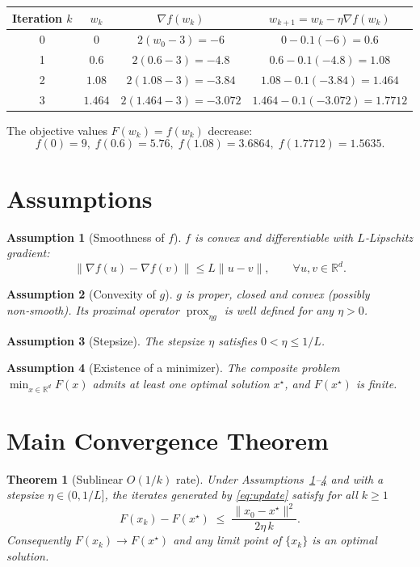 \documentclass{article}
\newtheorem{theorem}{Theorem}
\newtheorem{assumption}{Assumption}
\newcommand{\prox}{\operatorname{prox}}
\newcommand{\R}{\mathbb{R}}
\begin{document}
\begin{center}
\begin{tabular}{c|c|c|c}
Iteration $k$ & $w_{k}$ & $\nabla f(w_{k})$ & $w_{k+1}=w_{k}-\eta\nabla f(w_{k})$ \\ \hline
0 & $0$ & $2(w_{0}-3)=-6$ & $0-0.1(-6)=0.6$ \\
1 & $0.6$ & $2(0.6-3)=-4.8$ & $0.6-0.1(-4.8)=1.08$ \\
2 & $1.08$ & $2(1.08-3)=-3.84$ & $1.08-0.1(-3.84)=1.464$ \\
3 & $1.464$ & $2(1.464-3)=-3.072$ & $1.464-0.1(-3.072)=1.7712$
\end{tabular}
\end{center}
The objective values $F(w_{k})=f(w_{k})$ decrease:
\[
f(0)=9,\; f(0.6)=5.76,\; f(1.08)=3.6864,\; f(1.7712)=1.5635.
\]

\newpage
\section*{Assumptions}
\begin{assumption}[Smoothness of $f$]
\label{ass:smooth}
$f$ is convex and differentiable with $L$‑Lipschitz gradient:
\[
\|\nabla f(u)-\nabla f(v)\|\le L\|u-v\|,\qquad\forall u,v\in\R^{d}.
\]
\end{assumption}
\begin{assumption}[Convexity of $g$]
\label{ass:gconvex}
$g$ is proper, closed and convex (possibly non‑smooth). Its proximal operator $\prox_{\eta g}$ is well defined for any $\eta>0$.
\end{assumption}
\begin{assumption}[Stepsize]
\label{ass:stepsize}
The stepsize $\eta$ satisfies $0<\eta\le 1/L$.
\end{assumption}
\begin{assumption}[Existence of a minimizer]
\label{ass:opt}
The composite problem $\min_{x\in\R^{d}}F(x)$ admits at least one optimal solution $x^{\star}$, and $F(x^{\star})$ is finite.
\end{assumption}

\section*{Main Convergence Theorem}
\begin{theorem}[Sublinear $O(1/k)$ rate]
\label{thm:sublinear}
Under Assumptions~\ref{ass:smooth}--\ref{ass:opt} and with a stepsize $\eta\in(0,1/L]$, the iterates generated by \eqref{eq:update} satisfy for all $k\ge1$
\[
F(x_{k})-F(x^{\star})\;\le\;\frac{\|x_{0}-x^{\star}\|^{2}}{2\eta\,k}.
\]
Consequently $F(x_{k})\to F(x^{\star})$ and any limit point of $\{x_{k}\}$ is an optimal solution.
\end{theorem}
\end{document}
